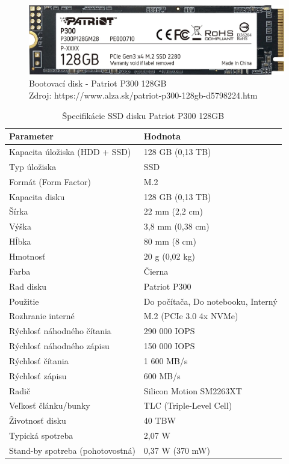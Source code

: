 \documentclass[12pt,oneside,slovak,a4paper]{article}
\begin{document}
\begin{figure}[H]
	\centering
	\captionsetup{justification=centering,margin=2cm}
	\includegraphics[scale=0.2]{./images/boot-drive.png} %
	\centering
	\caption{Bootovací disk - Patriot P300 128GB \\ Zdroj: https://www.alza.sk/patriot-p300-128gb-d5798224.htm}
\end{figure}

\pagebreak

\begin{table}[h]
\centering
\begin{tabularx}{\textwidth}{|l|X|}
\hline
\textbf{Parameter} & \textbf{Hodnota} \\ \hline
Kapacita úložiska (HDD + SSD) & 128 GB (0,13 TB) \\ \hline
Typ úložiska & SSD \\ \hline
Formát (Form Factor) & M.2 \\ \hline
Kapacita disku & 128 GB (0,13 TB) \\ \hline
Šírka & 22 mm (2,2 cm) \\ \hline
Výška & 3,8 mm (0,38 cm) \\ \hline
Hĺbka & 80 mm (8 cm) \\ \hline
Hmotnosť & 20 g (0,02 kg) \\ \hline
Farba & Čierna \\ \hline
Rad disku & Patriot P300 \\ \hline
Použitie & Do počítača, Do notebooku, Interný \\ \hline
Rozhranie interné & M.2 (PCIe 3.0 4x NVMe) \\ \hline
Rýchlosť náhodného čítania & 290 000 IOPS \\ \hline
Rýchlosť náhodného zápisu & 150 000 IOPS \\ \hline
Rýchlosť čítania & 1 600 MB/s \\ \hline
Rýchlosť zápisu & 600 MB/s \\ \hline
Radič & Silicon Motion SM2263XT \\ \hline
Veľkosť článku/bunky & TLC (Triple-Level Cell) \\ \hline
Životnosť disku & 40 TBW \\ \hline
Typická spotreba & 2,07 W \\ \hline
Stand-by spotreba (pohotovostná) & 0,37 W (370 mW) \\ \hline
\end{tabularx}
\caption{Špecifikácie SSD disku Patriot P300 128GB}
\end{table}
\end{document}
